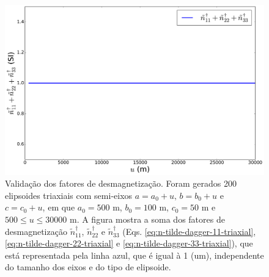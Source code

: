 \begin{figure}[hbt!]
	\centering \includegraphics[width=15 cm,height=10 cm]{figures/test_n_soma}
	\caption[Validação dos fatores de desmagnetização. Foram gerados 200 elipsoides triaxiais com semi-eixos $a = a_0 +u, \, b = b_0+u$ e $c = c_0+u$, em que $a_0=500$ m, $b_0=100$ m, $c_0=50$ m e $500  \le u \le 30000$ m. A figura mostra a soma dos fatores de desmagnetização $\tilde{n}^{\dagger}_{11}$, $\tilde{n}^{\dagger}_{22}$ e $\tilde{n}^{\dagger}_{33}$ (Eqs. \ref{eq:n-tilde-dagger-11-triaxial}, \ref{eq:n-tilde-dagger-22-triaxial} e \ref{eq:n-tilde-dagger-33-triaxial}), que está representada pela linha azul, que é igual à 1 (um), independente do tamanho dos eixos e do tipo de elipsoide.]{Validação dos fatores de desmagnetização. Foram gerados 200 elipsoides triaxiais com semi-eixos $a = a_0 +u, \, b = b_0+u$ e $c = c_0+u$, em que $a_0=500$ m, $b_0=100$ m, $c_0=50$ m e $500  \le u \le 30000$ m. A figura mostra a soma dos fatores de desmagnetização $\tilde{n}^{\dagger}_{11}$, $\tilde{n}^{\dagger}_{22}$ e $\tilde{n}^{\dagger}_{33}$ (Eqs. \ref{eq:n-tilde-dagger-11-triaxial}, \ref{eq:n-tilde-dagger-22-triaxial} e \ref{eq:n-tilde-dagger-33-triaxial}), que está representada pela linha azul, que é igual à 1 (um), independente do tamanho dos eixos e do tipo de elipsoide.}
	\label{fig:teste_n_soma}
\end{figure}
